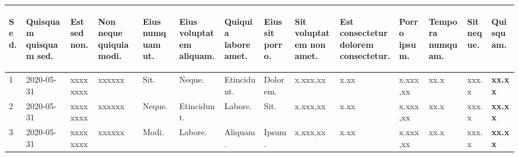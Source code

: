 \documentclass[a4paper,landscape]{article}%
\begin{document}
\begin{longtable}{|m{1cm}|m{1.7cm}|m{1.6cm}|m{1.9cm}|m{1.8cm}|m{1.8cm}|m{1.5cm}|m{1.6cm}|m{1.8cm}|m{1.6cm}|m{1.6cm}|m{1.2cm}|m{1.4cm}|m{1.4cm}|}%
\hline%
\begin{footnotesize}%
Sed.%
\end{footnotesize}&\begin{footnotesize}%
Quisquam quisquam sed.%
\end{footnotesize}&\begin{footnotesize}%
Est sed non.%
\end{footnotesize}&\begin{footnotesize}%
Non neque quiquia modi.%
\end{footnotesize}&\begin{footnotesize}%
Eius numquam ut.%
\end{footnotesize}&\begin{footnotesize}%
Eius voluptatem aliquam.%
\end{footnotesize}&\begin{footnotesize}%
Quiquia labore amet.%
\end{footnotesize}&\begin{footnotesize}%
Eius sit porro.%
\end{footnotesize}&\begin{footnotesize}%
Sit voluptatem non amet.%
\end{footnotesize}&\begin{footnotesize}%
Est consectetur dolorem consectetur.%
\end{footnotesize}&\begin{footnotesize}%
Porro ipsum.%
\end{footnotesize}&\begin{footnotesize}%
Tempora numquam.%
\end{footnotesize}&\begin{footnotesize}%
Sit neque.%
\end{footnotesize}&\begin{footnotesize}%
\textbf{Quisquam.}%
\end{footnotesize}\\%
\hline%
1&2020{-}05{-}31&xxxxxxxx&xxxxxx&Sit.&Neque.&Etincidunt.&Dolorem.&x.xxx,xx&x.xx&x.xxx,xx&xx.x&xxx.x&\textbf{xx.xx}\\%
\hline%
2&2020{-}05{-}31&xxxxxxxx&xxxxxx&Neque.&Etincidunt.&Labore.&Sit.&x.xxx,xx&x.xx&x.xxx,xx&xx.x&xxx.x&\textbf{xx.xx}\\%
\hline%
3&2020{-}05{-}31&xxxxxxxx&xxxxxx&Modi.&Labore.&Aliquam.&Ipsum.&x.xxx,xx&x.xx&x.xxx,xx&xx.x&xxx.x&\textbf{xx.xx}\\%

\end{longtable}
\end{document}
